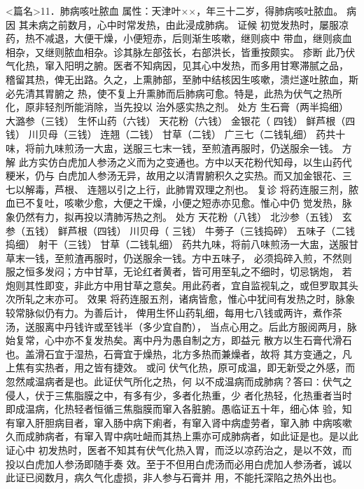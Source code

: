 \documentclass[a4paper,12pt,UTF8,twoside]{ctexbook}
\begin{document}
<篇名>11．肺病咳吐脓血
属性：天津叶××，年三十二岁，得肺病咳吐脓血。 
病因 其未病之前数月，心中时常发热，由此浸成肺病。 
证候 初觉发热时，屡服凉药，热不减退，大便干燥，小便短赤，后则渐生咳嗽，继则痰中 
带血，继则痰血相杂，又继则脓血相杂。诊其脉左部弦长，右部洪长，皆重按颇实。 
疹断 此乃伏气化热，窜入阳明之腑。医者不知病因，见其心中发热，而多用甘寒滞腻之品， 
稽留其热，俾无出路。久之，上熏肺部，至肺中结核因生咳嗽，溃烂遂吐脓血，斯必先清其胃腑之 
热，使不复上升熏肺而后肺病可愈。特是，此热为伏气之热所化，原非轻剂所能消除，当先投以 
治外感实热之剂。 
处方 生石膏（两半捣细） 大潞参（三钱） 生怀山药（六钱） 天花粉（六钱） 金银花（ 
四钱） 鲜芦根（四钱） 川贝母（三钱） 连翘（二钱） 甘草（二钱） 广三七（二钱轧细） 
药共十味，将前九味煎汤一大盅，送服三七末一钱，至煎渣再服时，仍送服余一钱。 
方解 此方实仿白虎加人参汤之义而为之变通也。方中以天花粉代知母，以生山药代粳米，仍与 
白虎加人参汤无异，故用之以清胃腑积久之实热。而又加金银花、三七以解毒，芦根、 
连翘以引之上行，此肺胃双理之剂也。 
复诊 将药连服三剂，脓血已不复吐，咳嗽少愈，大便之干燥，小便之短赤亦见愈。惟心中仍 
觉发热，脉象仍然有力，拟再投以清肺泻热之剂。 
处方 天花粉（八钱） 北沙参（五钱） 玄参（五钱） 鲜芦根（四钱） 川贝母（ 
三钱） 牛蒡子（三钱捣碎） 五味子（二钱捣细） 射干（三钱） 甘草（二钱轧细） 
药共九味，将前八味煎汤一大盅，送服甘草末一钱，至煎渣再服时，仍送服余一钱。方中五味子， 
必须捣碎入煎，不然则服之恒多发闷；方中甘草，无论红者黄者，皆可用至轧之不细时，切忌锅炮， 
若炮则其性即变，非此方中用甘草之意矣。用此药者，宜自监视轧之，或但罗取其头次所轧之末亦可。 
效果 将药连服五剂，诸病皆愈，惟心中犹间有发热之时，脉象较常脉似仍有力。为善后计， 
俾用生怀山药轧细，每用七八钱或两许，煮作茶汤，送服离中丹钱许或至钱半（多少宜自酌）， 
当点心用之。后此方服阅两月，脉始复常，心中亦不复发热矣。离中丹为愚自制之方，即益元 
散方以生石膏代滑石也。盖滑石宜于湿热，石膏宜于燥热，北方多热而兼燥者，故将 
其方变通之，凡上焦有实热者，用之皆有捷效。 
或问 伏气化热，原可成温，即无新受之外感，而忽然咸温病者是也。此证伏气所化之热，何 
以不成温病而成肺病？答曰∶伏气之侵人，伏于三焦脂膜之中，有多有少，多者化热重，少 
者化热轻，化热重者当时即成温病，化热轻者恒循三焦脂膜而窜入各脏腑。愚临证五十年，细心体 
验，知有窜入肝胆病目者，窜入肠中病下痢者，有窜入肾中病虚劳者，窜入肺 
中病咳嗽久而成肺病者，有窜入胃中病吐衄而其热上熏亦可成肺病者，如此证是也。是以此证心中 
初发热时，医者不知其有伏气化热入胃，而泛以凉药治之，是以不效，而投以白虎加人参汤即随手奏 
效。至于不但用白虎汤而必用白虎加人参汤者，诚以此证已阅数月，病久气化虚损，非人参与石膏并 
用，不能托深陷之热外出也。 
\end{document}
